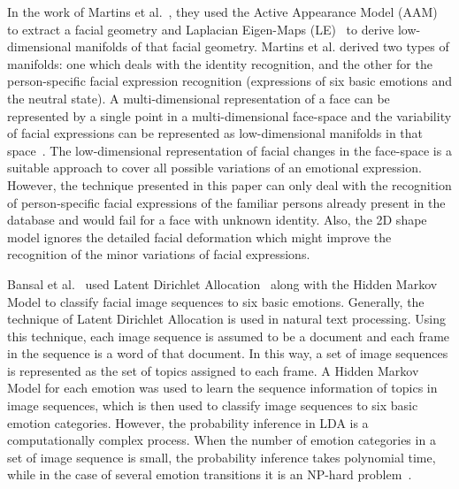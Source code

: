 \documentclass[10pt,journal,cspaper,compsoc]{IEEEtran}
\begin{document}
In the work of Martins et al.~\cite{martins2009identity}, they used the Active Appearance Model (AAM)~\cite{cootes1998active} to extract a facial geometry and Laplacian Eigen-Maps (LE)~\cite{belkin2001laplacian} to derive low-dimensional manifolds of that facial geometry. Martins et al. derived two types of manifolds: one which deals with the identity recognition, and the other for the person-specific facial expression recognition (expressions of six basic emotions and the neutral state). A multi-dimensional representation of a face can be represented by a single point in a multi-dimensional face-space and the variability of facial expressions can be represented as low-dimensional manifolds in that space~\cite{chang2006manifold}. The low-dimensional representation of facial changes in the face-space is a suitable approach to cover all possible variations of an emotional expression. However, the technique presented in this paper can only deal with the recognition of person-specific facial expressions of the familiar persons already present in the database and would fail for a face with unknown identity. Also, the 2D shape model ignores the detailed facial deformation which might improve the recognition of the minor variations of facial expressions.

Bansal et al.~\cite{bansal2013novel} used Latent Dirichlet Allocation~\cite{blei2003latent} along with the Hidden Markov Model to classify facial image sequences to six basic emotions. Generally, the technique of Latent Dirichlet Allocation is used in natural text processing. Using this technique, each image sequence is assumed to be a document and each frame in the sequence is a word of that document. In this way, a set of image sequences is represented as the set of topics assigned to each frame. A Hidden Markov Model for each emotion was used to learn the sequence information of topics in image sequences, which is then used to classify image sequences to six basic emotion categories. However, the probability inference in LDA is a computationally complex process. When the number of emotion categories in a set of image sequence is small,  the probability inference takes polynomial time, while in the case of several emotion transitions it is an NP-hard problem~\cite{sontag2011complexity}.
\end{document}
